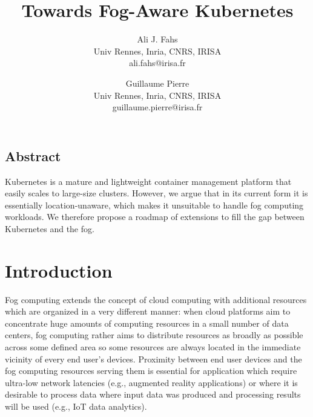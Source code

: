\documentclass[letterpaper,twocolumn,10pt]{article}
\begin{document}
\date{}
\title{\Large \bf Towards Fog-Aware Kubernetes}
\author{
{\rm Ali J. Fahs}\\
Univ Rennes, Inria, CNRS, IRISA\\
ali.fahs@irisa.fr
\and
{\rm Guillaume Pierre}\\
Univ Rennes, Inria, CNRS, IRISA\\
guillaume.pierre@irisa.fr
}
\maketitle
\thispagestyle{empty}


\subsection*{Abstract}

Kubernetes is a mature and lightweight container management platform
that easily scales to large-size clusters. However, we argue that in
its current form it is essentially location-unaware, which makes it
unsuitable to handle fog computing workloads. We therefore propose a
roadmap of extensions to fill the gap between Kubernetes and the fog.

\section{Introduction}

Fog computing extends the concept of cloud computing with additional
resources which are organized in a very different manner: when cloud
platforms aim to concentrate huge amounts of computing resources in a
small number of data centers, fog computing rather aims to distribute
resources as broadly as possible across some defined area so some
resources are always located in the immediate vicinity of every end
user's devices. Proximity between end user devices and the fog
computing resources serving them is essential for application which
require ultra-low network latencies (e.g., augmented reality
applications) or where it is desirable to process data where input
data was produced and processing results will be used (e.g., IoT data
analytics).


\end{document}
